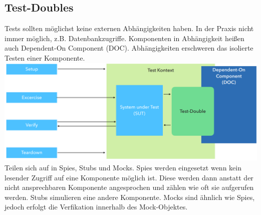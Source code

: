 \documentclass[12pt,a4paper]{article}
\begin{document}
\subsection{Test-Doubles}
Tests sollten möglichst keine externen Abhängigkeiten haben. In der Praxis nicht immer möglich, z.B. Datenbankzugriffe. Komponenten in Abhängigkeit heißen auch Dependent-On Component (DOC). Abhängigkeiten erschweren das isolierte Testen einer Komponente. \\
\includegraphics[width=\textwidth]{Bilder/test_double.PNG}
Teilen sich auf in Spies, Stubs und Mocks. Spies werden eingesetzt wenn kein lesender Zugriff auf eine Komponente möglich ist. Diese werden dann anstatt der nicht ansprechbaren Komponente angesprochen und zählen wie oft sie aufgerufen werden. Stubs simulieren eine andere Komponente. Mocks sind ähnlich wie Spies, jedoch erfolgt die Verfikation innerhalb des Mock-Objektes.
\end{document}
